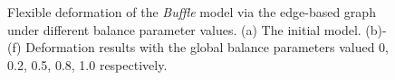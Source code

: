 \begin{figure} [htbp]
{\begin{minipage}[b]{0.32\textwidth}
    \end{minipage}}
  \caption{Flexible deformation of the \textit{Buffle} model via the edge-based graph under different balance parameter values. (a) The initial model. (b)-(f) Deformation results with the global balance parameters valued 0, 0.2, 0.5, 0.8, 1.0 respectively. }
  \label{fig:deformbuf} %
\end{figure}

